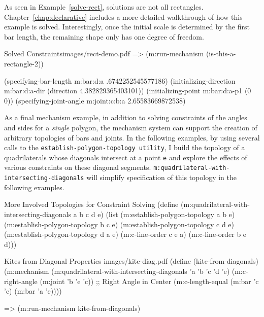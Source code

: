 As seen in Example~\ref{solve-rect}, solutions are not all
rectangles.  Chapter~\ref{chap:declarative} includes a more detailed
walkthrough of how this example is solved. Interestingly, once the
initial scale is determined by the first bar length, the remaining
shape only has one degree of freedom.

\begin{pdf-example}
[label=solve-rect]
{Solved Constraints}{images/rect-demo.pdf}
=> (m:run-mechanism (is-this-a-rectangle-2))

(specifying-bar-length m:bar:d:a .6742252545577186)
(initializing-direction m:bar:d:a-dir (direction 4.382829365403101))
(initializing-point m:bar:d:a-p1 (0 0))
(specifying-joint-angle m:joint:c:b:a 2.65583669872538)
\end{pdf-example}

As a final mechanism example, in addition to solving constraints of
the angles and sides for a \emph{single} polygon, the mechanism system
can support the creation of arbitrary topologies of bars and
joints. In the following examples, by using several calls to the
\texttt{establish-polygon-topology utility}, I build the topology of a
quadrilaterals whose diagonals intersect at a point \texttt{e} and
explore the effects of various constraints on these diagonal
segments. \texttt{m:quadrilateral-with-intersecting-diagonals} will
simplify specification of this topology in the following examples.

\begin{code-example}
[label=quad-diagonals]
{More Involved Topologies for Constraint Solving}
(define (m:quadrilateral-with-intersecting-diagonals a b c d e)
  (list (m:establish-polygon-topology a b e)
        (m:establish-polygon-topology b c e)
        (m:establish-polygon-topology c d e)
        (m:establish-polygon-topology d a e)
        (m:c-line-order c e a)
        (m:c-line-order b e d)))
\end{code-example}

\begin{pdf-example}
[label=kite-from-diag,
comment style={frame hidden,
opacityback=0,
height=5.6cm,
raster columns=2,graphics pages={1,2}}]
{Kites from Diagonal Properties}
{images/kite-diag.pdf}
(define (kite-from-diagonals)
  (m:mechanism
   (m:quadrilateral-with-intersecting-diagonals 'a 'b 'c 'd 'e)
   (m:c-right-angle (m:joint 'b 'e 'c)) ;; Right Angle in Center
   (m:c-length-equal (m:bar 'c 'e) (m:bar 'a 'e))))

=> (m:run-mechanism kite-from-diagonals)
\end{pdf-example}

